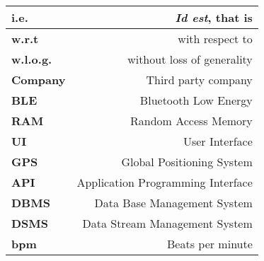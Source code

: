 \renewcommand{\arraystretch}{1.5}
\begin{center}
    \begin{tabular}{|l|r|}
        \hline
        \textbf{i.e.} & \textit{Id est}, that is  \\
        \hline
        \textbf{w.r.t} & with respect to  \\
        \hline
        \textbf{w.l.o.g.} & without loss of generality \\
        \hline
        \textbf{Company} & Third party company \\
        \hline
        \textbf{BLE} & Bluetooth Low Energy \\
        \hline
        \textbf{RAM} & Random Access Memory \\
        \hline
        \textbf{UI} & User Interface \\
        \hline
        \textbf{GPS} & Global Positioning System \\
        \hline
        \textbf{API} & Application Programming Interface \\
        \hline
        \textbf{DBMS} & Data Base Management System \\
        \hline
        \textbf{DSMS} & Data Stream Management System \\
        \hline        
        \textbf{bpm} & Beats per minute \\
        \hline
    \end{tabular}
\end{center}